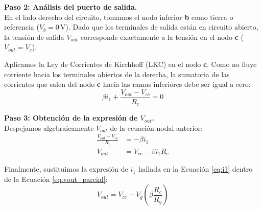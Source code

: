 \documentclass[12pt, a4paper]{article}
\begin{document}
\textbf{Paso 2: Análisis del puerto de salida.} \\
En el lado derecho del circuito, tomamos el nodo inferior \textbf{b} como tierra o referencia ($V_b = 0\,\text{V}$). Dado que los terminales de salida están en circuito abierto, la tensión de salida $V_{out}$ corresponde exactamente a la tensión en el nodo \textbf{c} ($V_{out} = V_c$).

Aplicamos la Ley de Corrientes de Kirchhoff (LKC) en el nodo \textbf{c}. Como no fluye corriente hacia los terminales abiertos de la derecha, la sumatoria de las corrientes que salen del nodo \textbf{c} hacia las ramas inferiores debe ser igual a cero:
\begin{equation*}
    \beta i_1 + \frac{V_{out} - V_{cc}}{R_c} = 0
\end{equation*}

\textbf{Paso 3: Obtención de la expresión de $V_{out}$.} \\
Despejamos algebraicamente $V_{out}$ de la ecuación nodal anterior:
\begin{align*}
    \frac{V_{out} - V_{cc}}{R_c} &= -\beta i_1 \\
    V_{out} &= V_{cc} - \beta i_1 R_c \tag{2} \label{eq:vout_parcial}
\end{align*}

Finalmente, sustituimos la expresión de $i_1$ hallada en la Ecuación \eqref{eq:i1} dentro de la Ecuación \eqref{eq:vout_parcial}:
\begin{equation}
    V_{out} = V_{cc} - V_g \left( \beta \frac{R_c}{R_g} \right)
\end{equation}
\end{document}
